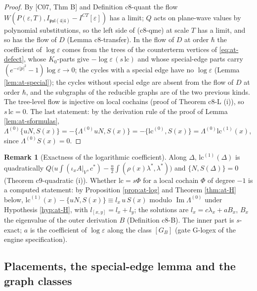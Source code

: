 \documentclass[11pt]{article}
\numberwithin{equation}{section}
\theoremstyle{plain}
\theoremstyle{definition}
\newtheorem{remark}[theorem]{Remark}
\newcommand{\AV}{A|_V}
\newcommand{\ICT}{I^{CT}[\varepsilon]}
\newcommand{\lc}{\mathrm{lc}}
\begin{document}
\begin{proof}
By [C07, Thm B] and Definition c8-quant the flow $W(P(\varepsilon,T),I_{\mathfrak{psl}(4|4)}-\ICT)$ has a limit; $Q$ acts on plane-wave values by polynomial substitutions, so the left side of (c8-qme) at scale $T$ has a limit, and so has the flow of $D$ (Lemma c8-transfer). In the flow of $D$ at order $\hbar$ the coefficient of $\log\varepsilon$ comes from the trees of the counterterm vertices of \eqref{eq:at-defect}, whose $K_0$-parts give $-\log\varepsilon\,(s\,\lc)$ and whose special-edge parts carry $(e^{-\varepsilon|p|^2}-1)\log\varepsilon\to0$; the cycles with a special edge have no $\log\varepsilon$ (Lemma \ref{lem:at-special}); the cycles without special edge are absent from the flow of $D$ at order $\hbar$, and the subgraphs of the reducible graphs are of the two previous kinds. The tree-level flow is injective on local cochains (proof of Theorem c8-L (i)), so $s\,\lc=0$. The last statement: by the derivation rule of the proof of Lemma \ref{lem:at-sformulas}, $\Lambda^{(0)}\{uN,S(x)\}=-\{\Lambda^{(0)}uN,S(x)\}=-\{\lc^{(0)},S(x)\}=\Lambda^{(0)}\lc^{(1)}(x)$, since $\Lambda^{(0)}S(x)=0$.
\end{proof}

\begin{remark}[Exactness of the logarithmic coefficient]
\label{rem:at-logexact}
Along $\Delta$, $\lc^{(1)}(\Delta)$ is quadratically $Q\big(u\int(\iota_x\AV,c^*)-\tfrac u2\int(\rho(x)\lambda^*,\lambda^*)\big)$ and $\{N,S(\Delta)\}=0$ (Theorem c9-quadratic (i)). Whether $\lc=s\Phi$ for a local cochain $\Phi$ of degree $-1$ is a computed statement: by Proposition \ref{prop:at-log} and Theorem \ref{thm:at-H} below, $\lc^{(1)}(x)-\{uN,S(x)\}\equiv l_x\,u\,S(x)$ modulo $\operatorname{Im}\Lambda^{(0)}$ under Hypothesis \ref{hyp:at-H}, with $l_{[x,y]}=l_x+l_y$; the solutions are $l_x=c\lambda_x+aB_x$, $B_x$ the eigenvalue of the outer derivation $B$ (Definition c8-B). The inner part is $s$-exact; $a$ is the coefficient of $\log\varepsilon$ along the class $[G_B]$ (gate G-logex of the engine specification).
\end{remark}

\subsection{Placements, the special-edge lemma and the graph classes}
\end{document}
